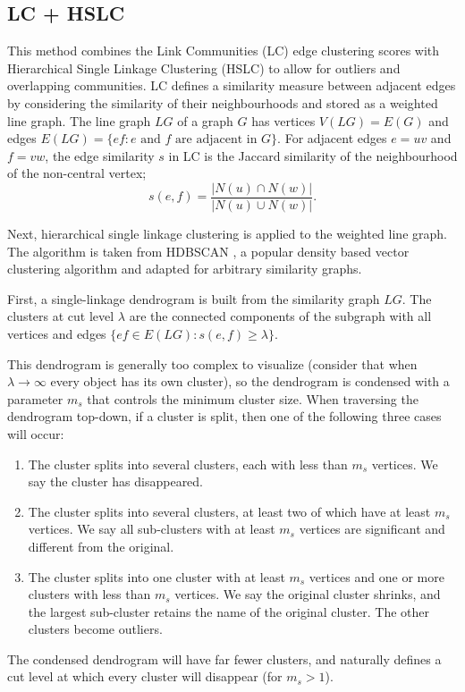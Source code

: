 \documentclass[review,los,12pt]{ryethesis}
\begin{document}
\subsection{LC + HSLC}
This method combines the Link Communities (LC) \cite{linkcoms} edge clustering scores with Hierarchical Single Linkage Clustering (HSLC) \cite{hslc} to allow for outliers and overlapping communities.
LC defines a similarity measure between adjacent edges by considering the similarity of their neighbourhoods and stored as a weighted line graph.
The line graph $LG$ of a graph $G$ has vertices $V(LG) = E(G)$ and edges $E(LG) = \{ef: e \text{ and } f \text{ are adjacent in } G \}$.
For adjacent edges $e = uv$ and $f = vw$, the edge similarity $s$ in LC is the Jaccard similarity of the neighbourhood of the non-central vertex;
\begin{equation}
    s(e,f) = \frac{|N(u) \cap N(w)|}{|N(u) \cup N(w)|}.
\end{equation}

Next, hierarchical single linkage clustering is applied to the weighted line graph.
The algorithm is taken from HDBSCAN \cite{hdbscan,hdbscancode}, a popular density based vector clustering algorithm and adapted for arbitrary similarity graphs.

First, a single-linkage dendrogram is built from the similarity graph $LG$.
The clusters at cut level $\lambda$ are the connected components of the subgraph with all vertices and edges $\{ef \in E(LG) : s(e, f) \geq \lambda\}$.

This dendrogram is generally too complex to visualize (consider that when $\lambda \to \infty$ every object has its own cluster), so the dendrogram is condensed with a parameter $m_s$ that controls the minimum cluster size.
When traversing the dendrogram top-down, if a cluster is split, then one of the following three cases will occur:
\begin{enumerate}
    \item The cluster splits into several clusters, each with less than $m_s$ vertices. We say the cluster has disappeared.
    \item The cluster splits into several clusters, at least two of which have at least $m_s$ vertices. We say all sub-clusters with at least $m_s$ vertices are significant and different from the original.
    \item The cluster splits into one cluster with at least $m_s$ vertices and one or more clusters with less than $m_s$ vertices. We say the original cluster shrinks, and the largest sub-cluster retains the name of the original cluster. The other clusters become outliers.
\end{enumerate}
The condensed dendrogram will have far fewer clusters, and naturally defines a cut level at which every cluster will disappear (for $m_s > 1$).
\end{document}

